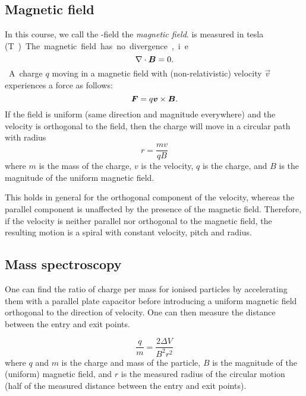 \subsection{Magnetic field}
    In this course, we call the \B-field the \textit{magnetic field}. \B{} is measured in tesla (\si\tesla).
    
    The magnetic field has no divergence, i.e.
    \begin{equation}
        \nabla \cdot \bm{B} = 0.
    \end{equation}
    A charge $q$ moving in a magnetic field with (non-relativistic) velocity $\vec{v}$ experiences a force as follows: 
    \begin{equation}
        \bm{F} = q\bm{v}\times \bm{B}.
    \end{equation}
    If the field is uniform (same direction and magnitude everywhere) and the velocity is orthogonal to the field, 
    then the charge will move in a circular path with radius
    \begin{equation}
        r = \frac{mv}{qB}
    \end{equation}
    where $m$ is the mass of the charge, $v$ is the velocity, $q$ is the charge, 
    and $B$ is the magnitude of the uniform magnetic field.
    
    This holds in general for the orthogonal component of the velocity, 
    whereas the parallel component is unaffected by the presence of the magnetic field. 
    Therefore, if the velocity is neither parallel nor orthogonal to the magnetic field, 
    the resulting motion is a spiral with constant velocity, pitch and radius.
    
\subsection{Mass spectroscopy}
    One can find the ratio of charge per mass for ionised particles by accelerating them with a parallel plate capacitor 
    before introducing a uniform magnetic field orthogonal to the direction of velocity. 
    One can then measure the distance between the entry and exit points.
    
    \begin{equation}
        \frac{q}{m} = \frac{2 \Delta V}{B^2 r^2}
    \end{equation}
    where $q$ and $m$ is the charge and mass of the particle, $B$ is the magnitude of the (uniform) magnetic field, 
    and $r$ is the measured radius of the circular motion (half of the measured distance between the entry and exit points).
    
